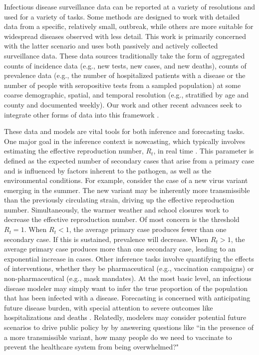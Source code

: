 Infectious disease surveillance data can be reported at a variety of resolutions and used for a variety of tasks.
Some methods are designed to work with detailed data from a specific, relatively small, outbreak, while others are more suitable for widespread diseases observed with less detail.
This work is primarily concerned with the latter scenario and uses both passively and actively collected surveillance data.
These data sources traditionally take the form of aggregated counts of incidence data (e.g., new tests, new cases, and new deaths), counts of prevalence data (e.g., the number of hospitalized patients with a disease or the number of people with seropositive tests from a sampled population) at some coarse demographic, spatial, and temporal resolution (e.g., stratified by age and county and documented weekly).
Our work and other recent advances seek to integrate other forms of data into this framework \citep{Tang2022, Rasmussen2011}.

These data and models are vital tools for both inference and forecasting tasks.
One major goal in the inference context is nowcasting, which typically involves estimating the effective reproduction number, \( R_t \), in real time \citep{10.1093/aje/kwt133}.
This parameter is defined as the expected number of secondary cases that arise from a primary case and is influenced by factors inherent to the pathogen, as well as the environmental conditions.
For example, consider the case of a new virus variant emerging in the summer.
The new variant may be inherently more transmissible than the previously circulating strain, driving up the effective reproduction number.
Simultaneously, the warmer weather and school closures work to decrease the effective reproduction number.
Of most concern is the threshold \( R_t = 1 \).
When \( R_t < 1 \), the average primary case produces fewer than one secondary case.
If this is sustained, prevalence will decrease.
When \( R_t > 1 \), the average primary case produces more than one secondary case, leading to an exponential increase in cases.
Other inference tasks involve quantifying the effects of interventions, whether they be pharmaceutical (e.g., vaccination campaigns) or non-pharmaceutical (e.g., mask mandates).
At the most basic level, an infectious disease modeler may simply want to infer the true proportion of the population that has been infected with a disease.
Forecasting is concerned with anticipating future disease burden, with special attention to severe outcomes like hospitalizations and deaths \citep{10.1371/journal.pmed.1003793}.
Relatedly, modelers may consider potential future scenarios to drive public policy by  by answering questions like ``in the presence of a more transmissible variant, how many people do we need to vaccinate to prevent the healthcare system from being overwhelmed?"


